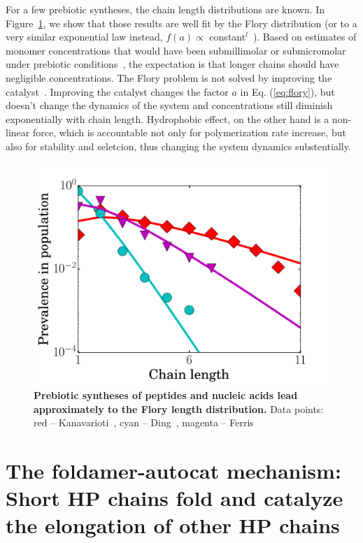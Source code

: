 \documentclass[journal=jacsat,manuscript=article,layout=twocolumn]{achemso}
\begin{document}
For a few prebiotic syntheses, the chain length distributions are known.  In 
Figure~\ref{fig:some_flory}, we show that those results are well fit by the Flory distribution (or 
to a very similar exponential law instead, 
$f(a)\propto$ constant$^l$~\cite{nowak2008prevolutionary,Derr2012}).  Based on estimates of monomer 
concentrations that would have been submillimolar or submicromolar under prebiotic 
conditions~\cite{Stribling1987,Huber1998,Aubrey2009,Kanavarioti2001,Lazcano1996}, the expectation is 
that longer chains should have negligible concentrations.  The Flory problem is not solved by 
improving the catalyst~\cite{Derr2012}. Improving the catalyst changes the factor $a$ in Eq. 
(\ref{eq:flory}), but doesn't change the dynamics of the system and concentrations still diminish 
exponentially with chain length. Hydrophobic effect, on the other hand is a non-linear force, which 
is accountable not only for polymerization rate increase, but also for stability and seletcion, thus 
changing the system dynamics substentially.

\begin{figure}[h!]
  \centering
  \includegraphics[width=\columnwidth]{pictures/some_flory.pdf} 
  \caption{\textbf{Prebiotic syntheses of peptides and nucleic acids lead approximately to the 
Flory length distribution.}  Data 
points: red -- Kanavarioti~\cite{Kanavarioti2001}, cyan -- Ding~\cite{Ding1996}, 
magenta -- Ferris~\cite{Ferris1999}}
  \label{fig:some_flory}
\end{figure}


\section{The foldamer-autocat mechanism: Short HP chains fold and catalyze the elongation of other 
HP chains}
\end{document}
